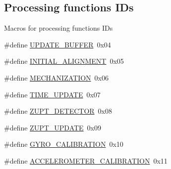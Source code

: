 \subsection*{\-Processing functions \-I\-Ds}
\label{_amgrp770404d72304ce44b8f2271ee9f5d4c5}%
 \-Macros for processing functions \-I\-Ds \begin{DoxyCompactItemize}
\item 
\#define \hyperlink{group__control__tables_gac644d2e05254dadd0b19a93c12c0afd9}{\-U\-P\-D\-A\-T\-E\-\_\-\-B\-U\-F\-F\-E\-R}~0x04
\item 
\#define \hyperlink{group__control__tables_ga88f8e60882c5d69d913d1b616687465d}{\-I\-N\-I\-T\-I\-A\-L\-\_\-\-A\-L\-I\-G\-N\-M\-E\-N\-T}~0x05
\item 
\#define \hyperlink{group__control__tables_gaec182aad2e49484d086d38c7ed1f9fe4}{\-M\-E\-C\-H\-A\-N\-I\-Z\-A\-T\-I\-O\-N}~0x06
\item 
\#define \hyperlink{group__control__tables_ga72e2455cf02251f80606a36183764cd1}{\-T\-I\-M\-E\-\_\-\-U\-P\-D\-A\-T\-E}~0x07
\item 
\#define \hyperlink{group__control__tables_ga2ea883c0ff4e6a5d37f32290ab3524b7}{\-Z\-U\-P\-T\-\_\-\-D\-E\-T\-E\-C\-T\-O\-R}~0x08
\item 
\#define \hyperlink{group__control__tables_ga7d004ff741f1e7caad510eaa0a548fc1}{\-Z\-U\-P\-T\-\_\-\-U\-P\-D\-A\-T\-E}~0x09
\item 
\#define \hyperlink{group__control__tables_ga5f00f42fc2574820abde7c7dd797a036}{\-G\-Y\-R\-O\-\_\-\-C\-A\-L\-I\-B\-R\-A\-T\-I\-O\-N}~0x10
\item 
\#define \hyperlink{group__control__tables_ga8b4361d794c38610770d0078d5a581f3}{\-A\-C\-C\-E\-L\-E\-R\-O\-M\-E\-T\-E\-R\-\_\-\-C\-A\-L\-I\-B\-R\-A\-T\-I\-O\-N}~0x11
\end{DoxyCompactItemize}
